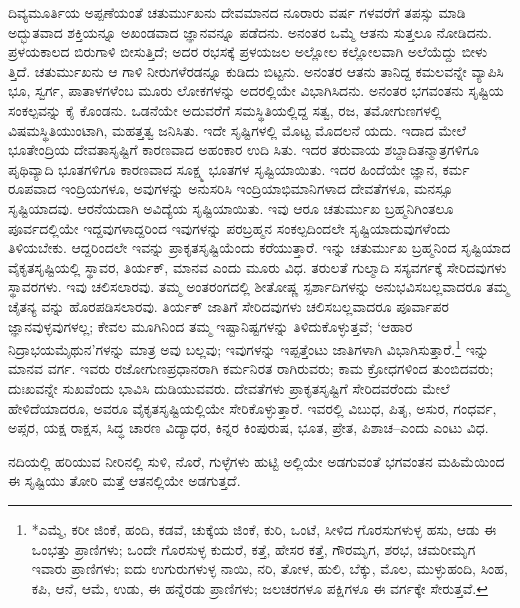 ದಿವ್ಯಮೂರ್ತಿಯ ಅಪ್ಪಣೆಯಂತೆ ಚತುರ್ಮುಖನು ದೇವಮಾನದ ನೂರಾರು ವರ್ಷ ಗಳವರೆಗೆ ತಪಸ್ಸು ಮಾಡಿ ಅದ್ಭುತವಾದ ಶಕ್ತಿಯನ್ನೂ ಅಖಂಡವಾದ ಜ್ಞಾನವನ್ನೂ ಪಡೆದನು. ಅನಂತರ ಒಮ್ಮೆ ಆತನು ಸುತ್ತಲೂ ನೋಡಿದನು. ಪ್ರಳಯಕಾಲದ ಬಿರುಗಾಳಿ ಬೀಸುತ್ತಿದೆ; ಅದರ ರಭಸಕ್ಕೆ ಪ್ರಳಯಜಲ ಅಲ್ಲೋಲ ಕಲ್ಲೋಲವಾಗಿ ಅಲೆಯೆದ್ದು ಬೀಳು ತ್ತಿದೆ. ಚತುರ್ಮುಖನು ಆ ಗಾಳಿ ನೀರುಗಳೆರಡನ್ನೂ ಕುಡಿದು ಬಿಟ್ಟನು. ಅನಂತರ ಆತನು ತಾನಿದ್ದ ಕಮಲವನ್ನೇ ವ್ಯಾಪಿಸಿ ಭೂ, ಸ್ವರ್ಗ, ಪಾತಾಳಗಳೆಂಬ ಮೂರು ಲೋಕಗಳನ್ನು ಅದರಲ್ಲಿಯೇ ವಿಭಾಗಿಸಿದನು. ಅನಂತರ ಭಗವಂತನು ಸೃಷ್ಟಿಯ ಸಂಕಲ್ಪವನ್ನು ಕೈ ಕೊಂಡನು. ಒಡನೆಯೇ ಅದುವರೆಗೆ ಸಮಸ್ಥಿತಿಯಲ್ಲಿದ್ದ ಸತ್ವ, ರಜ, ತಮೋಗುಣಗಳಲ್ಲಿ ವಿಷಮಸ್ಥಿತಿಯುಂಟಾಗಿ, ಮಹತ್ತತ್ವ ಜನಿಸಿತು. ಇದೇ ಸೃಷ್ಟಿಗಳಲ್ಲಿ ಮೊಟ್ಟ ಮೊದಲನೆ ಯದು. ಇದಾದ ಮೇಲೆ ಭೂತೇಂದ್ರಿಯ ದೇವತಾಸೃಷ್ಟಿಗೆ ಕಾರಣವಾದ ಅಹಂಕಾರ ಉದಿ ಸಿತು. ಇದರ ತರುವಾಯ ಶಬ್ದಾದಿತನ್ಮಾತ್ರಗಳಿಗೂ ಪೃಥಿವ್ಯಾದಿ ಭೂತಗಳಿಗೂ ಕಾರಣವಾದ ಸೂಕ್ಷ್ಮ ಭೂತಗಳ ಸೃಷ್ಟಿಯಾಯಿತು. ಇದರ ಹಿಂದೆಯೇ ಜ್ಞಾನ, ಕರ್ಮ ರೂಪವಾದ ಇಂದ್ರಿಯಗಳೂ, ಅವುಗಳನ್ನು ಅನುಸರಿಸಿ ಇಂದ್ರಿಯಾಭಿಮಾನಿಗಳಾದ ದೇವತೆಗಳೂ, ಮನಸ್ಸೂ ಸೃಷ್ಟಿಯಾದವು. ಆರನೆಯದಾಗಿ ಅವಿದ್ಯೆಯ ಸೃಷ್ಟಿಯಾಯಿತು. ಇವು ಆರೂ ಚತುರ್ಮುಖ ಬ್ರಹ್ಮನಿಗಿಂತಲೂ ಪೂರ್ವದಲ್ಲಿಯೇ ಇದ್ದವುಗಳಾದ್ದರಿಂದ ಇವುಗಳನ್ನು ಪರಬ್ರಹ್ಮನ ಸಂಕಲ್ಪದಿಂದಲೇ ಸೃಷ್ಟಿಯಾದುವುಗಳೆಂದು ತಿಳಿಯಬೇಕು. ಆದ್ದರಿಂದಲೇ ಇವನ್ನು ಪ್ರಾಕೃತಸೃಷ್ಟಿಯೆಂದು ಕರೆಯುತ್ತಾರೆ. ಇನ್ನು ಚತುರ್ಮುಖ ಬ್ರಹ್ಮನಿಂದ ಸೃಷ್ಟಿಯಾದ ವೈಕೃತಸೃಷ್ಟಿಯಲ್ಲಿ ಸ್ಥಾವರ, ತಿರ್ಯಕ್, ಮಾನವ ಎಂದು ಮೂರು ವಿಧ. ತರುಲತೆ ಗುಲ್ಮಾದಿ ಸಸ್ಯವರ್ಗಕ್ಕೆ ಸೇರಿದವುಗಳು ಸ್ಥಾವರಗಳು. ಇವು ಚಲಿಸಲಾರವು. ತಮ್ಮ ಅಂತರಂಗದಲ್ಲಿ ಶೀತೋಷ್ಣ ಸ್ಪರ್ಶಾದಿಗಳನ್ನು ಅನುಭವಿಸಬಲ್ಲವಾದರೂ ತಮ್ಮ ಚೈತನ್ಯ ವನ್ನು ಹೊರಪಡಿಸಲಾರವು. ತಿರ್ಯಕ್ ಜಾತಿಗೆ ಸೇರಿದವುಗಳು ಚಲಿಸಬಲ್ಲವಾದರೂ ಪೂರ್ವಾಪರ ಜ್ಞಾನವುಳ್ಳವುಗಳಲ್ಲ; ಕೇವಲ ಮೂಗಿನಿಂದ ತಮ್ಮ ಇಷ್ಟಾನಿಷ್ಟಗಳನ್ನು ತಿಳಿದುಕೊಳ್ಳುತ್ತವೆ; ‘ಆಹಾರ ನಿದ್ರಾಭಯಮೈಥುನ’ಗಳನ್ನು ಮಾತ್ರ ಅವು ಬಲ್ಲವು; ಇವುಗಳನ್ನು ಇಪ್ಪತ್ತೆಂಟು ಜಾತಿಗಳಾಗಿ ವಿಭಾಗಿಸುತ್ತಾರೆ.\footnote{*ಎಮ್ಮೆ, ಕರೀ ಜಿಂಕೆ, ಹಂದಿ, ಕಡವೆ, ಚುಕ್ಕೆಯ ಜಿಂಕೆ, ಕುರಿ, ಒಂಟೆ, ಸೀಳಿದ ಗೊರಸುಗಳುಳ್ಳ ಹಸು, ಆಡು ಈ ಒಂಭತ್ತು ಪ್ರಾಣಿಗಳು; ಒಂದೇ ಗೊರಸುಳ್ಳ ಕುದುರೆ, ಕತ್ತೆ, ಹೇಸರ ಕತ್ತೆ, ಗೌರಮೃಗ, ಶರಭ, ಚಮರೀಮೃಗ ಇವಾರು ಪ್ರಾಣಿಗಳು; ಐದು ಉಗುರುಗಳುಳ್ಳ ನಾಯಿ, ನರಿ, ತೋಳ, ಹುಲಿ, ಬೆಕ್ಕು, ಮೊಲ, ಮುಳ್ಳುಹಂದಿ, ಸಿಂಹ, ಕಪಿ, ಆನೆ, ಆಮೆ, ಉಡು, ಈ ಹನ್ನೆರಡು ಪ್ರಾಣಿಗಳು; ಜಲಚರಗಳೂ ಪಕ್ಷಿಗಳೂ ಈ ವರ್ಗಕ್ಕೇ ಸೇರುತ್ತವೆ.} ಇನ್ನು ಮಾನವ ವರ್ಗ. ಇವರು ರಜೋಗುಣಪ್ರಧಾನರಾಗಿ ಕರ್ಮನಿರತ ರಾಗಿರುವರು; ಕಾಮ ಕ್ರೋಧಗಳಿಂದ ತುಂಬಿದವರು; ದುಃಖವನ್ನೇ ಸುಖವೆಂದು ಭಾವಿಸಿ ದುಡಿಯುವವರು. ದೇವತೆಗಳು ಪ್ರಾಕೃತಸೃಷ್ಟಿಗೆ ಸೇರಿದವರೆಂದು ಮೇಲೆ ಹೇಳಿದೆಯಾದರೂ, ಅವರೂ ವೈಕೃತಸೃಷ್ಟಿಯಲ್ಲಿಯೇ ಸೇರಿಕೊಳ್ಳುತ್ತಾರೆ. ಇವರಲ್ಲಿ ವಿಬುಧ, ಪಿತೃ, ಅಸುರ, ಗಂಧರ್ವ, ಅಪ್ಸರ, ಯಕ್ಷ ರಾಕ್ಷಸ, ಸಿದ್ಧ ಚಾರಣ ವಿದ್ಯಾಧರ, ಕಿನ್ನರ ಕಿಂಪುರುಷ, ಭೂತ, ಪ್ರೇತ, ಪಿಶಾಚ–ಎಂದು ಎಂಟು ವಿಧ.

ನದಿಯಲ್ಲಿ ಹರಿಯುವ ನೀರಿನಲ್ಲಿ ಸುಳಿ, ನೊರೆ, ಗುಳ್ಳೆಗಳು ಹುಟ್ಟಿ ಅಲ್ಲಿಯೇ ಅಡಗುವಂತೆ ಭಗವಂತನ ಮಹಿಮೆಯಿಂದ ಈ ಸೃಷ್ಟಿಯು ತೋರಿ ಮತ್ತೆ ಆತನಲ್ಲಿಯೇ ಅಡಗುತ್ತದೆ.

